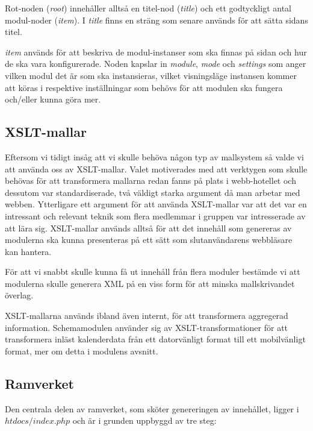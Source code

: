 Rot-noden ({\it root}) innehåller alltså en titel-nod ({\it title}) och ett
godtyckligt antal modul-noder ({\it item}). I {\it title} finns en sträng som
senare används för att sätta sidans titel.

{\it item} används för att beskriva de modul-instanser som ska finnas på sidan
och hur de ska vara konfigurerade. Noden kapslar in {\it module}, {\it mode} och
{\it settings} som anger vilken modul det är som ska instansieras, vilket
visningsläge instansen kommer att köras i respektive inställningar som behövs
för att modulen ska fungera och/eller kunna göra mer.

\subsection{XSLT-mallar}
Eftersom vi tidigt insåg att vi skulle behöva någon typ av mallsystem så valde
vi att använda oss av XSLT-mallar. Valet motiverades med att verktygen som
skulle behövas för att transformera mallarna redan fanns på plats i webb-hotellet
och dessutom var standardiserade, två väldigt starka argument då man arbetar med
webben. Ytterligare ett argument för att använda XSLT-mallar var att det
var en intressant och relevant teknik som flera medlemmar i gruppen var
intresserade av att lära sig.
XSLT-mallar används alltså för att det innehåll som genereras av
modulerna ska kunna presenteras på ett sätt som slutanvändarens webbläsare kan
hantera.

För att vi snabbt skulle kunna få ut innehåll från flera moduler bestämde vi att
modulerna skulle generera XML på en viss form för att minska mallskrivandet
överlag.

XSLT-mallarna används ibland även internt, för att transformera aggregerad
information. Schemamodulen använder sig av XSLT-transformationer för att
transformera inläst kalenderdata från ett datorvänligt format till ett
mobilvänligt format, mer om detta i modulens avsnitt.

\subsection{Ramverket}

Den centrala delen av ramverket, som sköter genereringen av innehållet, ligger
i $htdocs/index.php$ och är i grunden uppbyggd av tre steg:

